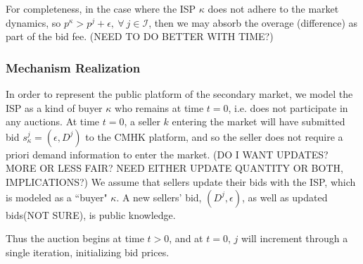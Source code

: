 \documentclass[sigconf, anonymous]{acmart}
\newcommand{\mcI}{\mathcal{I}}
\theoremstyle{definition}
\begin{document}
For completeness, in the case where the ISP $\kappa$ 
does not adhere to the market dynamics, so $p^\kappa > p^j +
\epsilon, \ \forall \ j \in\mcI$, then we may absorb the overage (difference) as part of the
bid fee.
(NEED TO DO BETTER WITH TIME?)

\subsubsection{Mechanism Realization}

In order to represent the public platform of the secondary market, we model the ISP as
a kind of buyer $\kappa$ who remains at time $t=0$, i.e. does not participate
in any auctions. At time $t=0$, a seller $k$ entering the market will have
submitted bid $s_\kappa^j =(\epsilon, D^j)$ to the CMHK platform, and so the
seller does not require a priori demand information to enter the market.
(DO I WANT UPDATES? MORE OR LESS FAIR? NEED EITHER UPDATE QUANTITY OR BOTH,
IMPLICATIONS?)
We assume that sellers update their bids with the ISP, which is modeled as a
``buyer" $\kappa$. 
A new sellers' bid, $(D^j, \epsilon)$, as well as updated bids(NOT SURE), is public
knowledge. 
\iffalse
A buyer entering the market
at $t=0$ is assumed to have an initial nonzero bid price, which we may assume
(SAY BETTER!) is initialized as 
an independently and identically distributed (i.i.d.) random variable $p_i^j=X$ with
probability $\mathcal{P}$,
$$
    \mathcal{P}[\epsilon\le X \le \kappa] =
\displaystyle\int_\epsilon^{p^\kappa} \mathfrak{f}(x) \
ds,
$$
where $p^\kappa$ is the overage charge of the ISP, and $\mathfrak{f}$ the probability
density function of $X$.
\fi
Thus the auction
begins at time $t>0$, and at $t=0$, $j$ will increment through a single iteration,
initializing bid prices.
\end{document}
